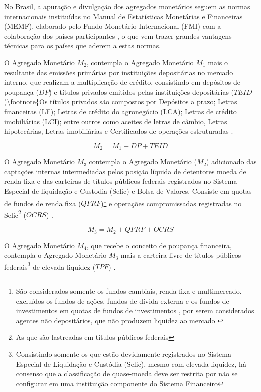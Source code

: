 \documentclass[
  12pt,
  12pt,
  openright,
  oneside,
  a4paper,
  chapter=TITLE,
  section=TITLE,
  subsection=TITLE,
  subsubsection=TITLE,
  english,
  portugues,
  sumario=tradicional]{abntex2}
\begin{document}
No Brasil, a apuração e divulgação dos agregados monetários seguem as normas internacionais instituídas no Manual de Estatísticas Monetárias e Financeiras (MEMF), elaborado pelo Fundo Monetário Internacional (FMI) com a colaboração dos países participantes \cite{sgs:mpa}, o que vem trazer grandes vantagens técnicas para os países que aderem a estas normas.

O Agregado Monetário \(M_2\), contempla o Agregado Monetário \(M_1\) mais o resultante das emissões primárias por instituições depositárias no mercado interno, que realizam a multiplicação de crédito, consistindo em depósitos de poupança (\(DP\)) e títulos privados emitidos pelas instituições depositárias (\(TEID\))\textbackslash footnote\{Os títulos privados são compostos por Depósitos a prazo; Letras financeiras (LF); Letras de crédito do agronegócio (LCA); Letras de crédito imobiliárias (LCI); entre outros como aceites de letras de câmbio, Letras hipotecárias, Letras imobiliárias e Certificados de operações estruturadas \cite{sgs:mpa}.

\begin{equation}
M_2 = M_1 + DP + TEID
\end{equation}

O Agregado Monetário \(M_3\) contempla o Agregado Monetário (\(M_2\)) adicionado das captações internas intermediadas pelos posição líquida de detentores moeda de renda fixa e das carteiras de títulos públicos federais registrados no Sistema Especial de liquidação e Custodia (Selic) e Bolsa de Valores. Consiste em quotas de fundos de renda fixa (\(QFRF\))\footnote{São considerados somente os fundos cambiais, renda fixa  e multimercado. excluídos os fundos de ações, fundos de dívida externa e os fundos de investimentos em quotas de fundos de investimentos , por serem considerados agentes não depositários, que não produzem liquidez ao mercado \cite{sgs:mpa}} e operações compromissadas registradas no Selic\footnote{As que são lastreadas em títulos públicos federais} (\(OCRS\)) \cite{bcb:2019} \cite{sgs:mpa}.

\begin{equation}
M_3 = M_2 + QFRF + OCRS
\end{equation}

O Agregado Monetário \(M_4\), que recebe o conceito de poupança financeira, contempla o Agregado Monetário \(M_3\) mais a carteira livre de títulos públicos federais\footnote{Consistindo somente os que estão devidamente registrados no Sistema Especial de Liquidação e Custódia (Selic), mesmo com elevada liquidez, há consenso que a classificação de quase-moeda deve ser restrita por não se configurar em uma instituição componente do Sistema Financeiro} de elevada liquidez (\(TPF\)) \cite{bcb:2019}.
\end{document}

